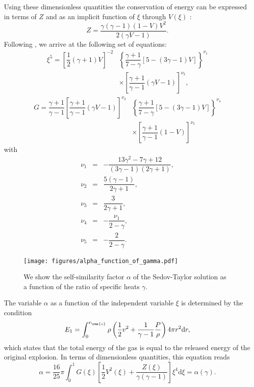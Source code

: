 \documentclass[8pt,a4paper,usenatbib]{mnras}
\newcommand{\de}{\mathrm{d}}
\begin{document}
Using these dimensionless quantities the conservation of energy can be expressed
in terms of $Z$ and as an implicit function of $\xi$ through $V(\xi)$
\citep{1966hydr.book.....L}:
\begin{equation}
Z = \dfrac{\gamma(\gamma-1)(1-V)V^2}{2(\gamma V -1)} .
\end{equation}
Following \citet{1966hydr.book.....L}, we arrive at the following set of
equations:
\begin{equation}
\begin{aligned}
  \xi^5 = \left[ \dfrac{1}{2}(\gamma+1)V \right]^{-2}
  &\left\lbrace \dfrac{\gamma+1}{7-\gamma}[5-(3\gamma-1)V] \right\rbrace^{\nu_1}  \\
  & \times \left[ \dfrac{\gamma+1}{\gamma-1} (\gamma V -1) \right]^{\nu_2},
 \end{aligned}
\end{equation} 
\begin{equation}
\begin{aligned}
  G = \dfrac{\gamma+1}{\gamma-1} \left[ \dfrac{\gamma+1}{\gamma-1} (\gamma V -1) \right]^{\nu_3}
  & \left\lbrace \dfrac{\gamma+1}{7-\gamma}[5-(3\gamma-1)V] \right\rbrace^{\nu_4} \\
  & \times \left[ \dfrac{\gamma+1}{\gamma-1} (1- V) \right]^{\nu_5}
\end{aligned}
\end{equation}
with
\begin{eqnarray}
  \nu_1 &=& -\dfrac{13 \gamma^2 - 7\gamma+12}{(3\gamma-1)(2\gamma+1)},\\
  \nu_2 &=& \dfrac{5(\gamma-1)}{2\gamma+1},  \\
  \nu_3 &=& \dfrac{3}{2\gamma+1},\\
  \nu_4 &=& -\dfrac{\nu_1}{2-\gamma},\\
  \nu_5 &=& -\dfrac{2}{2-\gamma}.
\end{eqnarray}

\begin{figure}
\centering
\texttt{[image: figures/alpha\_function\_of\_gamma.pdf]}
\caption{We show the self-similarity factor $\alpha$ of the Sedov-Taylor
  solution as a function of the ratio of specific heats $\gamma$.}
\label{fig:alpha}
\end{figure}

The variable $\alpha$ as a function of the independent variable $\xi$ is
determined by the condition
\begin{equation}
  E_1 = \int_0^{r_{\rmn{s}}} \rho
  \left( \dfrac{1}{2} v^2 + \dfrac{1}{\gamma -1}\dfrac{P}{\rho}\right) 4 \pi r^2 \de r  ,
\end{equation}
which states that the total energy of the gas is equal to the released energy of
the original explosion.  In terms of dimensionless quantities, this
equation reads
\begin{equation}
\alpha = \dfrac{16}{25}\pi \int_0^1 G(\xi) \left[ \dfrac{1}{2} V^2(\xi) + \dfrac{Z(\xi)}{\gamma(\gamma-1)} \right] \xi^4 \de \xi = \alpha(\gamma)   .
\end{equation}
\end{document}
